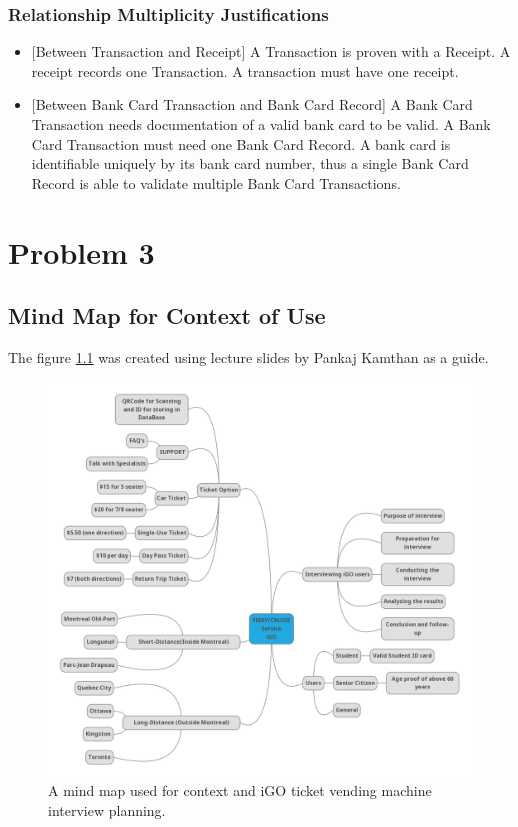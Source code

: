 \documentclass[letterpaper]{report}
\begin{document}
\subsection{Relationship Multiplicity Justifications}
\begin{itemize}
    \item {[Between Transaction and Receipt]} A Transaction is proven with a Receipt. A receipt records one Transaction. A transaction must have one receipt.
    \item {[Between Bank Card Transaction and Bank Card Record]} A Bank Card Transaction needs documentation of a valid bank card to be valid. A Bank Card Transaction must need one Bank Card Record. A bank card is identifiable uniquely by its bank card number, thus a single Bank Card Record is able to validate multiple Bank Card Transactions.
\end{itemize}

\chapter{Problem 3}
\section{Mind Map for Context of Use}
The figure \ref{fig:MindMap} was created using lecture slides by Pankaj Kamthan\cite{MindMap} as a guide.
\begin{figure}[h]
    \centering
    \includegraphics[height=0.52\textheight]{Interviews/MindMap/Mind Map.png}
    \caption{A mind map used for context and iGO ticket vending machine interview planning.}
    \label{fig:MindMap}
\end{figure}
\clearpage
\end{document}
